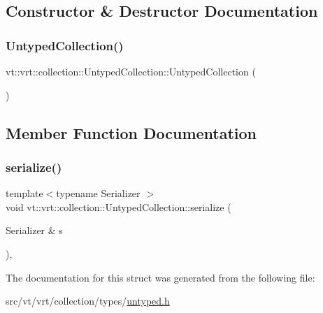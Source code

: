 \subsection{Constructor \& Destructor Documentation}
\mbox{\label{structvt_1_1vrt_1_1collection_1_1_untyped_collection_aebf5af4f6a9b0376dd35e1fb3fd85bac}} 
\subsubsection{\texorpdfstring{Untyped\+Collection()}{UntypedCollection()}}
{\footnotesize\ttfamily vt\+::vrt\+::collection\+::\+Untyped\+Collection\+::\+Untyped\+Collection (\begin{DoxyParamCaption}{ }\end{DoxyParamCaption})\hspace{0.3cm}{\ttfamily [default]}}



\subsection{Member Function Documentation}
\mbox{\label{structvt_1_1vrt_1_1collection_1_1_untyped_collection_a77ef18b8f78de273ba193051dcb69e56}} 
\subsubsection{\texorpdfstring{serialize()}{serialize()}}
{\footnotesize\ttfamily template$<$typename Serializer $>$ \\
void vt\+::vrt\+::collection\+::\+Untyped\+Collection\+::serialize (\begin{DoxyParamCaption}\item[{Serializer \&}]{s }\end{DoxyParamCaption})\hspace{0.3cm}{\ttfamily [inline]}, {\ttfamily [protected]}}



The documentation for this struct was generated from the following file\+:\begin{DoxyCompactItemize}
\item 
src/vt/vrt/collection/types/\hyperlink{untyped_8h}{untyped.\+h}\end{DoxyCompactItemize}
